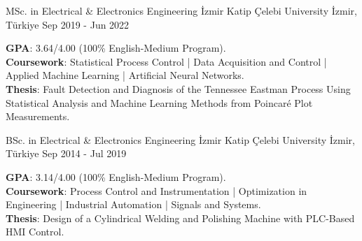 \vspace{-2mm}

\begin{cventries}

  \cventry
    {MSc. in Electrical \& Electronics Engineering} %
    {İzmir Katip Çelebi University} %
    {İzmir, Türkiye} %
    {Sep 2019 - Jun 2022} %
    {
      \begin{cvitems} %
        \textbf{GPA}: 3.64/4.00 (100\% English-Medium Program).\\
        \textbf{Coursework}: Statistical Process Control | Data Acquisition and Control | Applied Machine Learning | Artificial Neural Networks.\\
        \textbf{Thesis}: Fault Detection and Diagnosis of the Tennessee Eastman Process Using Statistical Analysis and Machine Learning Methods from Poincaré Plot Measurements.
      \end{cvitems}
    }

  \cventry
    {BSc. in Electrical \& Electronics Engineering} %
    {İzmir Katip Çelebi University} %
    {İzmir, Türkiye} %
    {Sep 2014 - Jul 2019} %
    {
      \begin{cvitems} %
        \textbf{GPA}: 3.14/4.00 (100\% English-Medium Program).\\
        \textbf{Coursework}: Process Control and Instrumentation | Optimization in Engineering | Industrial Automation | Signals and Systems.\\
        \textbf{Thesis}: Design of a Cylindrical Welding and Polishing Machine with PLC-Based HMI Control.
      \end{cvitems}
    }

\end{cventries}
